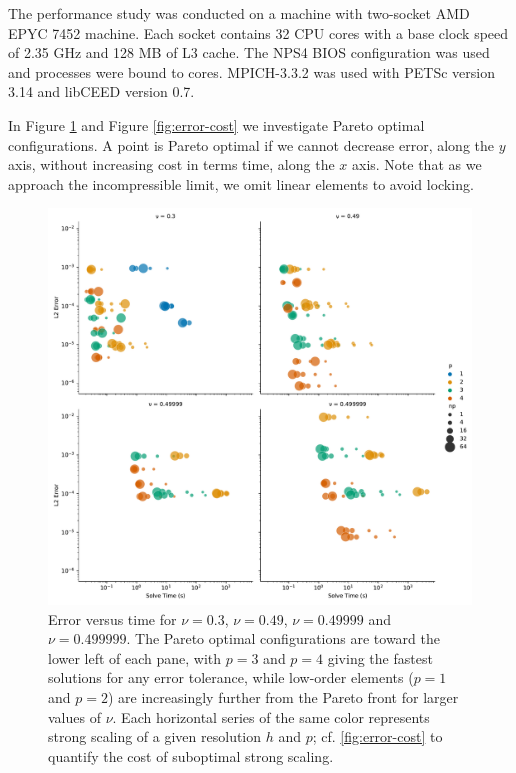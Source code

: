 The performance study was conducted on a machine with two-socket AMD EPYC 7452 machine.
Each socket contains 32 CPU cores with a base clock speed of 2.35 GHz and 128 MB of L3 cache.
The NPS4 BIOS configuration was used and processes were bound to cores.
MPICH-3.3.2 was used with PETSc version 3.14 and libCEED version 0.7.

In Figure \ref{fig:error-time} and Figure \ref{fig:error-cost} we investigate Pareto optimal configurations.
A point is Pareto optimal if we cannot decrease error, along the $y$ axis, without increasing cost in terms time, along the $x$ axis.
Note that as we approach the incompressible limit, we omit linear elements to avoid locking.

\begin{figure}[pbt!]
 \begin{center}
      \includegraphics[width=1\textwidth]{../img/error-time.pdf}
\end{center}
\caption{
Error versus time for $\nu = 0.3$, $\nu = 0.49$, $\nu = 0.49999$ and $\nu = 0.499999$.
The Pareto optimal configurations are toward the lower left of each pane, with $p = 3$ and $p = 4$ giving the fastest solutions for any error tolerance, while low-order elements ($p = 1$ and $p = 2$) are increasingly further from the Pareto front for larger values of $\nu$.
Each horizontal series of the same color represents strong scaling of a given resolution $h$ and $p$; cf. \autoref{fig:error-cost} to quantify the cost of suboptimal strong scaling.
}
    \label{fig:error-time}
\end{figure}

